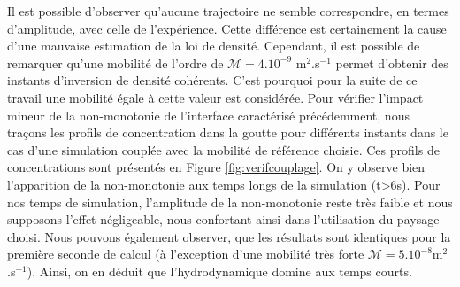 Il est possible d'observer qu'aucune trajectoire ne semble correspondre, en termes d'amplitude, avec celle de l'expérience. Cette différence est certainement la cause d'une mauvaise estimation de la loi de densité. Cependant, il est possible de remarquer qu'une mobilité de l'ordre de $\mathcal{M} = 4.10^{-9}$ m$^2$.s$^{-1}$ permet d'obtenir des instants d'inversion de densité cohérents. C'est pourquoi pour la suite de ce travail une mobilité égale à cette valeur est considérée. Pour vérifier l'impact mineur de la non-monotonie de l'interface caractérisé précédemment, nous traçons les profils de concentration dans la goutte pour différents instants dans le cas d'une simulation couplée avec la mobilité de référence choisie. Ces profils de concentrations sont présentés en Figure \ref{fig:verifcouplage}. On y observe bien l'apparition de la non-monotonie aux temps longs de la simulation (t>6s). Pour nos temps de simulation, l'amplitude de la non-monotonie reste très faible et nous supposons l'effet négligeable, nous confortant ainsi dans l'utilisation du paysage choisi. Nous pouvons également observer, que les résultats sont identiques pour la première seconde de calcul (à l'exception d'une mobilité très forte $\mathcal{M} = 5.10^{-8}$m$^2$.s$^{-1}$). Ainsi, on en déduit que l'hydrodynamique domine aux temps courts.
